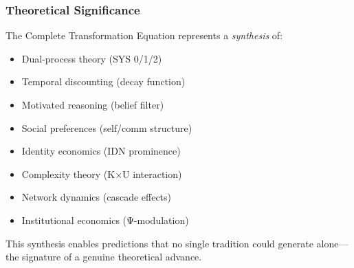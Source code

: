\subsubsection{Theoretical Significance}

The Complete Transformation Equation represents a \emph{synthesis} of:
\begin{itemize}
    \item Dual-process theory (SYS 0/1/2)
    \item Temporal discounting (decay function)
    \item Motivated reasoning (belief filter)
    \item Social preferences (self/comm structure)
    \item Identity economics (IDN prominence)
    \item Complexity theory (K×U interaction)
    \item Network dynamics (cascade effects)
    \item Institutional economics (Ψ-modulation)
\end{itemize}

This synthesis enables predictions that no single tradition could generate 
alone—the signature of a genuine theoretical advance.
